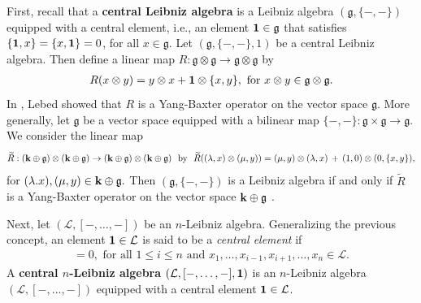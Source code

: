 \documentclass[a4paper,reqno,10pt]{amsart}
\theoremstyle{plain}
\theoremstyle{definition}
\theoremstyle{remark}
\begin{document}
First, recall that a {\bf central Leibniz algebra} is a Leibniz algebra $(\mathfrak{g}, \{ -, - \})$ equipped with a central element, i.e., an element ${\bf 1} \in \mathfrak{g}$ that satisfies $\{ {\bf 1} , x \} = \{ x, {\bf 1} \} = 0$, for all $x \in \mathfrak{g}$. Let $(\mathfrak{g}, \{ -, - \}, 1)$ be a central Leibniz algebra. Then define a linear map $R : \mathfrak{g} \otimes \mathfrak{g} \rightarrow  \mathfrak{g} \otimes \mathfrak{g} $ by 
\begin{align}\label{lebed-exp}
    R (x \otimes y ) = y \otimes x + {\bf 1} \otimes \{ x, y \}, \text{ for } x \otimes y \in \mathfrak{g} \otimes \mathfrak{g}.
\end{align}
In \cite{lebed2}, Lebed showed that $R$ is a Yang-Baxter operator on the vector space $\mathfrak{g}$. More generally, let $\mathfrak{g}$ be a vector space equipped with a bilinear map $\{ - , - \} : \mathfrak{g} \times \mathfrak{g} \rightarrow \mathfrak{g}$. We consider the linear map 
\begin{align*}
\widetilde{R} : ({\bf k} \oplus \mathfrak{g}) \otimes ({\bf k} \oplus \mathfrak{g}) \rightarrow ({\bf k} \oplus \mathfrak{g}) \otimes ({\bf k} \oplus \mathfrak{g}) ~ \text{ by } ~\widetilde{R} ((\lambda, x) \otimes (\mu, y)) = (\mu, y) \otimes (\lambda, x) ~ \! +~ \!(1, 0) \otimes (0, \{x, y \}),
\end{align*}
for $(\lambda. x), (\mu, y )\in {\bf k} \oplus \mathfrak{g}.$ Then $(\mathfrak{g}, \{ -, - \})$ is a Leibniz algebra if and only if $\widetilde{R}$ is a Yang-Baxter operator on the vector space ${\bf k} \oplus \mathfrak{g}$ \cite{baez-crans}.


\medskip

Next, let $(\mathcal{L}, [-, \ldots, -])$ be an $n$-Leibniz algebra. Generalizing the previous concept, an element ${\bf 1} \in \mathcal{L}$ is said to be a {\em central element} if 
\begin{align*}
[ x_1, \ldots, x_{i-1}, {\bf 1}, x_{i+1}, \ldots, x_n ] = 0, \text{ for all } 1 \leq i \leq n \text{ and } x_1, \ldots, x_{i-1}, x_{i+1}, \ldots, x_n \in \mathcal{L}.
\end{align*}
A {\bf central $n$-Leibniz algebra} $(\mathcal{L}, [-, \ldots, -], {\bf 1})$ is an $n$-Leibniz algebra $(\mathcal{L}, [-, \ldots, -])$ equipped with a central element ${\bf 1} \in \mathcal{L}$.
\end{document}
